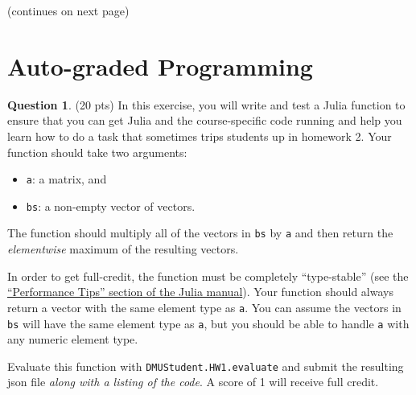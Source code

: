 \documentclass{article}
\theoremstyle{definition}
\newtheorem{question}[thm]{Question}
\begin{document}
(continues on next page)

\pagebreak

\section{Auto-graded Programming}

\begin{question} (20 pts)
    In this exercise, you will write and test a Julia function to ensure that you can get Julia and the course-specific code running and help you learn how to do a task that sometimes trips students up in homework 2. Your function should take two arguments:
    \begin{itemize}[nosep]
        \item \texttt{a}: a matrix, and
        \item \texttt{bs}: a non-empty vector of vectors.
    \end{itemize}
    The function should multiply all of the vectors in \texttt{bs} by \texttt{a} and then return the \emph{elementwise} maximum of the resulting vectors.

    In order to get full-credit, the function must be completely ``type-stable'' (see the \href{https://docs.julialang.org/en/v1/manual/performance-tips/#Write-%22type-stable%22-functions}{``Performance Tips'' section of the Julia manual}). Your function should always return a vector with the same element type as \texttt{a}. You can assume the vectors in \texttt{bs} will have the same element type as \texttt{a}, but you should be able to handle \texttt{a} with any numeric element type.

    Evaluate this function with \texttt{DMUStudent.HW1.evaluate} and submit the resulting json file \textit{along with a listing of the code}. A score of 1 will receive full credit.
\end{question}
\end{document}
